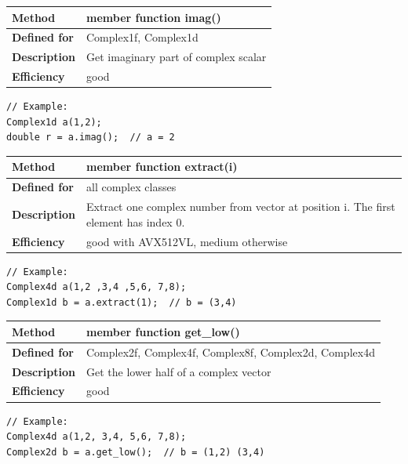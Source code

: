 \documentclass[11pt,a4paper,oneside,openright]{report}
\newcommand{\vspacesmall}{\vspace{3mm}}
\newcommand{\vspacebig}{\vspace{6mm}}
\begin{document}
\begin{tabular}{|p{25mm}|p{100mm}|}
\hline
\bfseries Method & member function imag() \\ \hline
\bfseries Defined for & Complex1f, Complex1d \\ \hline
\bfseries Description & Get imaginary part of complex scalar \\ \hline
\bfseries Efficiency & good \\ \hline
\end{tabular}
\vspacesmall

\begin{lstlisting}[frame=none]
// Example:
Complex1d a(1,2);
double r = a.imag();  // a = 2
\end{lstlisting}
\vspacebig


\begin{tabular}{|p{25mm}|p{100mm}|}
\hline
\bfseries Method & member function extract(i) \\ \hline
\bfseries Defined for & all complex classes \\ \hline
\bfseries Description & Extract one complex number from vector at position i. \newline
The first element has index 0. \\ \hline
\bfseries Efficiency & good with AVX512VL, medium otherwise \\ \hline
\end{tabular}
\vspacesmall

\begin{lstlisting}[frame=none]
// Example:
Complex4d a(1,2 ,3,4 ,5,6, 7,8);
Complex1d b = a.extract(1);  // b = (3,4)
\end{lstlisting}
\vspacebig


\begin{tabular}{|p{25mm}|p{100mm}|}
\hline
\bfseries Method & member function get\_low() \\ \hline
\bfseries Defined for & Complex2f, Complex4f, Complex8f, Complex2d, Complex4d
 \\ \hline
\bfseries Description & Get the lower half of a complex vector \\ \hline
\bfseries Efficiency & good \\ \hline
\end{tabular}
\vspacesmall

\begin{lstlisting}[frame=none]
// Example:
Complex4d a(1,2, 3,4, 5,6, 7,8);
Complex2d b = a.get_low();  // b = (1,2) (3,4)
\end{lstlisting}
\vspacebig
\end{document}

